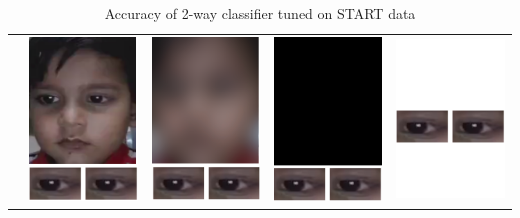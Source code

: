 \begin{table}[h]
  \centering
    \caption{Accuracy of 2-way classifier tuned on START data}
    \label{tab:2way_tune-START}
    \begin{tabular}{|c||c|c|c|c|}
      \hline
         & \includegraphics[scale=0.2,valign=m]{GazePreservingRedaction/No_redaction} & \includegraphics[scale=0.2,valign=m]{GazePreservingRedaction/Face_blurred} & \includegraphics[scale=0.2,valign=m]{GazePreservingRedaction/Face_blacked} & \includegraphics[scale=0.2,valign=m]{GazePreservingRedaction/No_face} \\

\end{tabular}
\end{table}
